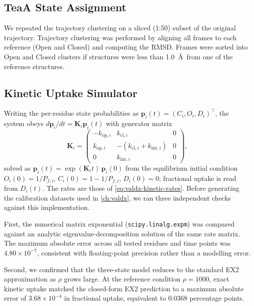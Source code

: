 \subsection{TeaA State Assignment}
\label{app:valdx-teaa-states}

We repeated the trajectory clustering on a sliced (1:50) subset of the original trajectory. Trajectory clustering was performed by aligning all frames to each reference (Open and Closed) and computing the RMSD. Frames were sorted into Open and Closed clusters if structures were less than 1.0~\AA\ from one of the reference structures.

\subsection{Kinetic Uptake Simulator}
\label{app:valdx-kinetic-simulator}

Writing the per-residue state probabilities as $\mathbf{p}_i(t)=(C_i,O_i,D_i)^\top$, the system obeys $d\mathbf{p}_i/dt=\mathbf{K}_i\mathbf{p}_i(t)$ with generator matrix
\begin{equation}
    \mathbf{K}_i=
    \begin{pmatrix}
    -k_{\text{op},i} & k_{\text{cl},i} & 0 \\
    k_{\text{op},i} & -(k_{\text{cl},i}+k_{\text{int},i}) & 0 \\
    0 & k_{\text{int},i} & 0
    \end{pmatrix},
    \label{eq:valdx-kinetic-generator}
\end{equation}
solved as $\mathbf{p}_i(t)=\exp(\mathbf{K}_i t)\,\mathbf{p}_i(0)$ from the equilibrium initial condition $O_i(0)=1/P_{f,i}$, $C_i(0)=1-1/P_{f,i}$, $D_i(0)=0$; fractional uptake is read from $D_i(t)$. The rates are those of \cref{eq:valdx-kinetic-rates}. Before generating the calibration datasets used in \cref{ch:valdx}, we ran three independent checks against this implementation.

First, the numerical matrix exponential (\texttt{scipy.linalg.expm}) was compared against an analytic eigenvalue-decomposition solution of the same rate matrix. The maximum absolute error across all tested residues and time points was $4.80\times10^{-7}$, consistent with floating-point precision rather than a modelling error.

Second, we confirmed that the three-state model reduces to the standard EX2 approximation as $\rho$ grows large. At the reference condition $\rho=1000$, exact kinetic uptake matched the closed-form EX2 prediction to a maximum absolute error of $3.68\times10^{-4}$ in fractional uptake, equivalent to 0.0368 percentage points.


